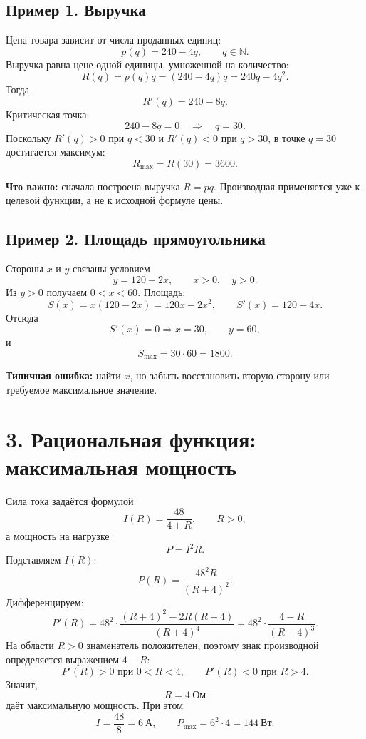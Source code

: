\documentclass[a4paper,12pt]{article}
\newcommand{\key}[1]{\textcolor{darkaccent}{\textbf{#1}}}
\newcommand{\important}[1]{\textcolor{warn}{\textbf{#1}}}
\newcommand{\N}{\mathbb{N}}
\begin{document}
\subsection*{Пример 1. Выручка}
Цена товара зависит от числа проданных единиц:
\[
p(q)=240-4q,\qquad q\in\N.
\]
Выручка равна цене одной единицы, умноженной на количество:
\[
R(q)=p(q)q=(240-4q)q=240q-4q^2.
\]
Тогда
\[
R'(q)=240-8q.
\]
Критическая точка:
\[
240-8q=0 \quad\Longrightarrow\quad q=30.
\]
Поскольку \(R'(q)>0\) при \(q<30\) и \(R'(q)<0\) при \(q>30\), в точке \(q=30\) достигается максимум:
\[
\boxed{R_{\max}=R(30)=3600}.
\]

\begin{center}
\end{center}

\key{Что важно:} сначала построена выручка \(R=pq\). Производная применяется уже к целевой функции, а не к исходной формуле цены.

\subsection*{Пример 2. Площадь прямоугольника}
Стороны \(x\) и \(y\) связаны условием
\[
y=120-2x,\qquad x>0,\quad y>0.
\]
Из \(y>0\) получаем \(0<x<60\). Площадь:
\[
S(x)=x(120-2x)=120x-2x^2,
\qquad S'(x)=120-4x.
\]
Отсюда
\[
S'(x)=0 \Longrightarrow x=30,\qquad y=60,
\]
и
\[
\boxed{S_{\max}=30\cdot60=1800}.
\]

\important{Типичная ошибка:} найти \(x\), но забыть восстановить вторую сторону или требуемое максимальное значение.

\clearpage

\section*{3. Рациональная функция: максимальная мощность}

Сила тока задаётся формулой
\[
I(R)=\frac{48}{4+R},\qquad R>0,
\]
а мощность на нагрузке
\[
P=I^2R.
\]
Подставляем \(I(R)\):
\[
P(R)=\frac{48^2R}{(R+4)^2}.
\]
Дифференцируем:
\[
P'(R)=48^2\cdot\frac{(R+4)^2-2R(R+4)}{(R+4)^4}
=48^2\cdot\frac{4-R}{(R+4)^3}.
\]
На области \(R>0\) знаменатель положителен, поэтому знак производной определяется выражением \(4-R\):
\[
P'(R)>0 \text{ при }0<R<4,\qquad
P'(R)<0 \text{ при }R>4.
\]
Значит,
\[
\boxed{R=4\ \text{Ом}}
\]
даёт максимальную мощность. При этом
\[
I=\frac{48}{8}=6\ \text{А},\qquad
\boxed{P_{\max}=6^2\cdot4=144\ \text{Вт}}.
\]
\end{document}
